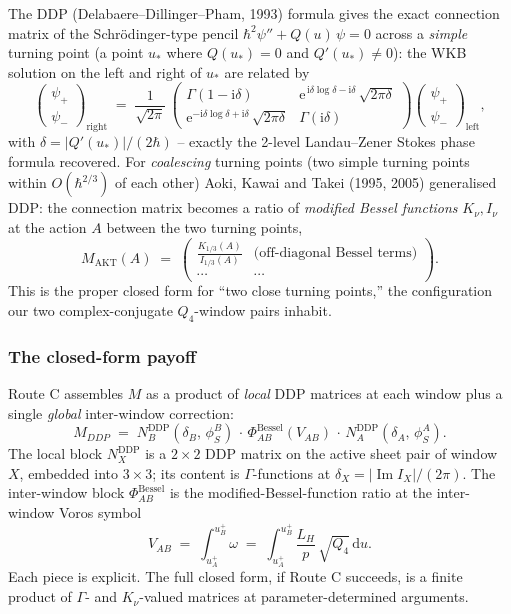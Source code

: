 \documentclass[11pt]{article}
\newcommand{\ii}{\mathrm i}\newcommand{\dd}{\mathrm d}
\newcommand{\im}{\operatorname{Im}}
\begin{document}
The DDP (Delabaere--Dillinger--Pham, 1993) formula gives the exact
connection matrix of the Schr\"odinger-type pencil
$\hbar^2 \psi'' + Q(u)\,\psi = 0$ across a \emph{simple} turning
point (a point $u_*$ where $Q(u_*)=0$ and $Q'(u_*)\ne 0$): the
WKB solution on the left and right of $u_*$ are related by
\[
\begin{pmatrix} \psi_+ \\ \psi_- \end{pmatrix}_{\text{right}}
\;=\;
\frac{1}{\sqrt{2\pi}}\,
\begin{pmatrix}
 \Gamma(1-\ii\delta) & \mathrm e^{\,\ii\delta\log\delta - \ii\delta}\,\sqrt{2\pi\delta}\\[2pt]
 \mathrm e^{-\ii\delta\log\delta + \ii\delta}\,\sqrt{2\pi\delta} & \Gamma(\ii\delta)
\end{pmatrix}
\begin{pmatrix} \psi_+ \\ \psi_- \end{pmatrix}_{\text{left}},
\]
with $\delta = |Q'(u_*)|/(2\hbar)$ -- exactly the 2-level
Landau--Zener Stokes phase formula recovered. For
\emph{coalescing} turning points (two simple turning points within
$O(\hbar^{2/3})$ of each other) Aoki, Kawai and Takei (1995, 2005)
generalised DDP: the connection matrix becomes a ratio of
\emph{modified Bessel functions} $K_\nu, I_\nu$ at the action $A$
between the two turning points,
\[
M_{\mathrm{AKT}}(A) \;=\;
\begin{pmatrix}
 \frac{K_{1/3}(A)}{I_{1/3}(A)} & \text{(off-diagonal Bessel terms)}\\
 \cdots & \cdots
\end{pmatrix}.
\]
This is the proper closed form for ``two close turning points,'' the
configuration our two complex-conjugate $Q_4$-window pairs inhabit.

\subsubsection*{The closed-form payoff}

Route C assembles $M$ as a product of \emph{local} DDP matrices at
each window plus a single \emph{global} inter-window correction:
\[
M_{DDP}
\;=\;
N_B^{\text{DDP}}(\delta_B,\,\phi_S^B)\,\cdot\,
\Phi_{AB}^{\text{Bessel}}(V_{AB})\,\cdot\,
N_A^{\text{DDP}}(\delta_A,\,\phi_S^A).
\]
The local block $N_X^{\text{DDP}}$ is a $2\times2$ DDP matrix on the
active sheet pair of window $X$, embedded into $3\times3$; its
content is $\Gamma$-functions at $\delta_X = |\im I_X|/(2\pi)$. The
inter-window block $\Phi_{AB}^{\text{Bessel}}$ is the
modified-Bessel-function ratio at the inter-window Voros symbol
\[
V_{AB} \;=\; \int_{u_A^+}^{u_B^+}\!\!\omega
\;=\; \int_{u_A^+}^{u_B^+}\!\!\frac{L_H}{p}\,\sqrt{Q_4}\,\dd u.
\]
Each piece is explicit. The full closed form, if Route C succeeds, is
a finite product of $\Gamma$- and $K_\nu$-valued matrices at
parameter-determined arguments.
\end{document}
